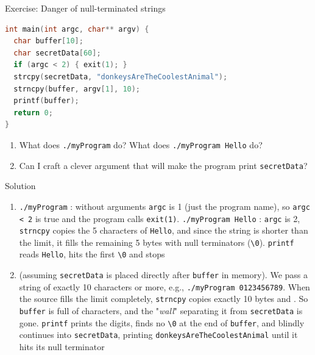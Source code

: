 \begin{parag}{Exercise: Danger of null-terminated strings}
    \begin{lstlisting}[language=C]
int main(int argc, char** argv) {
  char buffer[10];
  char secretData[60];
  if (argc < 2) { exit(1); }
  strcpy(secretData, "donkeysAreTheCoolestAnimal");
  strncpy(buffer, argv[1], 10);
  printf(buffer);
  return 0;
}
    \end{lstlisting}
    \begin{enumerate}
        \item What does \texttt{./myProgram} do? What does \texttt{./myProgram Hello} do?
        \item Can I craft a clever argument that will make the program print \texttt{secretData}?
    \end{enumerate}
    \begin{subparag}{Solution}
        \begin{enumerate}
            \item \texttt{./myProgram} : without arguments \texttt{argc} is 1 (just the program name), so \texttt{argc < 2} is true and the program calls \texttt{exit(1)}. \texttt{./myProgram Hello} : \texttt{argc} is 2, \texttt{strncpy} copies the 5 characters of \texttt{Hello}, and since the string is shorter than the limit, it fills the remaining 5 bytes with null terminators (\texttt{\textbackslash 0}). \texttt{printf} reads \texttt{Hello}, hits the first \texttt{\textbackslash 0} and stops
            \item {} (assuming \texttt{secretData} is placed directly after \texttt{buffer} in memory). We pass a string of exactly 10 characters or more, e.g., \texttt{./myProgram 0123456789}. When the source fills the limit completely, \texttt{strncpy} copies exactly 10 bytes and . So \texttt{buffer} is full of characters, and the "\textit{wall}" separating it from \texttt{secretData} is gone. \texttt{printf} prints the digits, finds no \texttt{\textbackslash 0} at the end of \texttt{buffer}, and blindly continues into \texttt{secretData}, printing \texttt{donkeysAreTheCoolestAnimal} until it hits its null terminator
        \end{enumerate}
    \end{subparag}
\end{parag}

